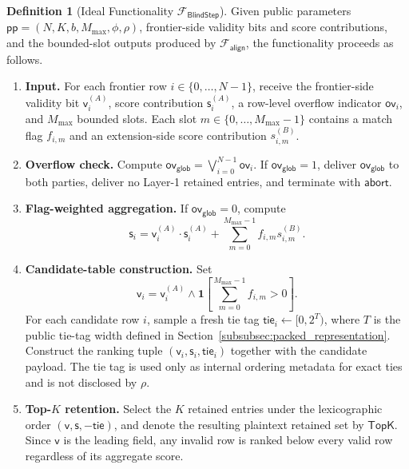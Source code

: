 \documentclass[conference,compsoc,letterpaper]{IEEEtran}
\theoremstyle{definition}
\newtheorem{definition}[theorem]{Definition}
\theoremstyle{remark}
\newcommand{\FBlindStep}{\mathcal{F}_{\textsf{BlindStep}}}
\newcommand{\Falign}{\mathcal{F}_{\mathsf{align}}}
\newcommand{\pp}{\mathsf{pp}}
\newcommand{\Mmax}{M_{\max}}
\newcommand{\compat}{\phi}
\newcommand{\policy}{\rho}
\newcommand{\scorebits}{b}
\newcommand{\valid}{\mathsf{v}}
\newcommand{\score}{\mathsf{s}}
\newcommand{\tie}{\mathsf{tie}}
\newcommand{\overflow}{\mathsf{ov}}
\newcommand{\globaloverflow}{\mathsf{ov}_{\mathsf{glob}}}
\begin{document}
\begin{definition}[Ideal Functionality $\FBlindStep$]
\label{def:functionality}
Given public parameters $\pp=(N,K,\scorebits,\Mmax,\compat,\policy)$, frontier-side validity bits and score contributions, and the bounded-slot
outputs produced by $\Falign{}$, the functionality proceeds as follows.

\begin{enumerate}[label=(\arabic*), leftmargin=*, nosep]
    \item \textbf{Input.}
    For each frontier row $i\in\{0,\ldots,N-1\}$, receive the
    frontier-side validity bit $\valid_i^{(A)}$, score contribution
    $\score_i^{(A)}$, a row-level overflow indicator $\overflow_i$, and
    $\Mmax$ bounded slots. Each slot
    $m\in\{0,\ldots,\Mmax-1\}$ contains a match flag $f_{i,m}$ and an
    extension-side score contribution $s^{(B)}_{i,m}$.

    \item \textbf{Overflow check.}
    Compute $\globaloverflow=\bigvee_{i=0}^{N-1}\overflow_i$.
    If $\globaloverflow=1$, deliver $\globaloverflow$ to both parties,
    deliver no Layer-1 retained entries, and terminate with
    $\mathsf{abort}$.

    \item \textbf{Flag-weighted aggregation.}
    If $\globaloverflow=0$, compute
    \[
    \score_i
    =
    \valid_i^{(A)}\cdot\score_i^{(A)}
    +
    \sum_{m=0}^{\Mmax-1}f_{i,m}s^{(B)}_{i,m}.
    \]

    \item \textbf{Candidate-table construction.}
    Set
    \[
    \valid_i
    =
    \valid_i^{(A)}
    \wedge
    \mathbf{1}\!\left[
    \sum_{m=0}^{\Mmax-1} f_{i,m}>0
    \right].
    \]
    For each candidate row $i$, sample a fresh tie tag
    $\tie_i \leftarrow [0,2^T)$, where $T$ is the public tie-tag width
    defined in Section~\ref{subsubsec:packed_representation}.
    Construct the ranking tuple $(\valid_i,\score_i,\tie_i)$ together with
    the candidate payload. The tie tag is used only as internal ordering
    metadata for exact ties and is not disclosed by $\policy$.

    \item \textbf{Top-$K$ retention.}
    Select the $K$ retained entries under the lexicographic order
    $(\valid,\score,-\tie)$, and denote the resulting plaintext retained
    set by $\mathsf{TopK}$. Since $\valid$ is the leading field, any
    invalid row is ranked below every valid row regardless of its aggregate
    score.


\end{enumerate}
\end{definition}
\end{document}
